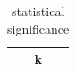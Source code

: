 \begin{table}[h]
\centering
\begin{tabular}{|c|}
\hline
k \\ \hline
\hline
\end{tabular}
\caption{statistical significance}
\label{tab:T16}
\end{table}
